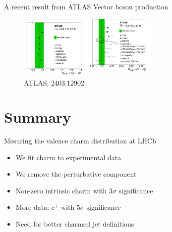 \documentclass[aspectratio=43, 8pt,t]{beamer}
\begin{document}
\begin{frame}{A recent result from ATLAS}
  Vector boson production
  \begin{figure}
    \includegraphics[width=0.6\textwidth]{atlas_vbf.png}
    \caption*{\color{gray}\footnotesize ATLAS, 2403.12902}
  \end{figure}
\end{frame}

\section{Summary}
\begin{frame}{Mesuring the valence charm distribution at LHCb}
  \begin{itemize}
    \item We fit charm to experimental data
    \item We remove the perturbative component
    \item Non-zero intrinsic charm with 3$\sigma$ significance
    \item More data: $c^+$ with 5$\sigma$ significance
    \item Need for better charmed jet definitions
  \end{itemize}

  \vspace*{5em}
\end{frame}
\end{document}
